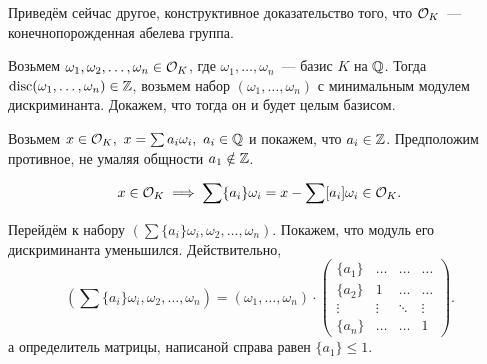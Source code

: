 \begin{definition}
\begin{homework}
			Приведём сейчас другое, конструктивное доказательство того, что $\mathcal{O}_{K}$~--- конечнопорожденная абелева группа. 

			Возьмем $\omega_{1}, \omega_{2}, \ldots, \omega_{n} \in \mathcal{O}_{K}$, где $\omega_{1}, \ldots, \omega_{n}$~--- базис $K$ на $\mathbb{Q}$.
			Тогда $\operatorname{disc}(\omega_{1}, \ldots, \omega_{n}) \in \mathbb{Z}$, возьмем набор $(\omega_1, \ldots, \omega_n)$ с минимальным модулем дискриминанта. Докажем, что тогда он и будет целым базисом. 

			Возьмем $x \in \mathcal{O}_{K}, \ x = \sum a_i \omega_i, \ a_i \in \mathbb{Q}$ и покажем, что $a_i \in \mathbb{Z}$. Предположим противное, не умаляя общности $a_{1} \notin \mathbb{Z}$. 


			\[
				x \in \mathcal{O}_{K} \implies \sum \{ a_i \}\omega_{i} = x - \sum [a_i] \omega_i \in \mathcal{O}_{K}.
			\]

			Перейдём к набору $(\sum \{ a_i \}\omega_{i}, \omega_{2}, \ldots, \omega_{n})$. Покажем, что модуль его дискриминанта уменьшился. Действительно, 
			\[
				(\sum \{ a_i \}\omega_{i}, \omega_{2}, \ldots, \omega_{n}) = (\omega_{1}, \ldots, \omega_{n}) \cdot \begin{pmatrix} \{ a_{1}\} & \ldots & \ldots & \ldots \\ \{ a_{2}\} & 1 & \ldots & \ldots \\ \vdots & \vdots & \ddots & \vdots \\ \{ a_n\} & \ldots & \ldots & 1 \end{pmatrix}.
			\]
			а определитель матрицы, написаной справа равен $\{ a_1 \} \le 1$.
		\end{homework}
	\end{definition}